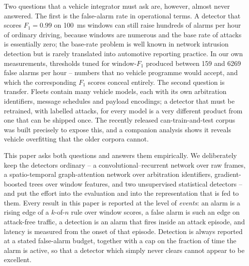 \documentclass[preprint,11pt,authoryear]{elsarticle}
\begin{document}
Two questions that a vehicle integrator must ask are, however, almost never answered. The first is
the false-alarm rate in operational terms. A detector that scores $F_1 = 0.99$ on
\SI{100}{\milli\second} windows can still raise hundreds of alarms per hour of ordinary driving,
because windows are numerous and the base rate of attacks is essentially zero; the
base-rate problem is well known in network intrusion detection \citep{flood2024baddesign,
goldschmidt2025datasets} but is rarely translated into automotive reporting practice. In our own
measurements, thresholds tuned for window-$F_1$ produced between 159 and 6269 false alarms per hour
-- numbers that no vehicle programme would accept, and which the corresponding $F_1$ scores conceal
entirely. The second question is transfer. Fleets contain many vehicle models, each with its own
arbitration identifiers, message schedules and payload encodings; a detector that must be retrained,
with labelled attacks, for every model is a very different product from one that can be shipped
once. The recently released can-train-and-test corpus \citep{lampe2023cantt} was built precisely to
expose this, and a companion analysis \citep{kidmose2025cansleuth} shows it reveals vehicle
overfitting that the older corpora cannot.

This paper asks both questions and answers them empirically. We deliberately keep the detectors
ordinary -- a convolutional--recurrent network over raw frames, a spatio-temporal graph-attention
network over arbitration identifiers, gradient-boosted trees over window features, and two
unsupervised statistical detectors -- and put the effort into the evaluation and into the
representation that is fed to them. Every result in this paper is reported at the level of
\emph{events}: an alarm is a rising edge of a $k$-of-$n$ rule over window scores, a false alarm is
such an edge on attack-free traffic, a detection is an alarm that fires inside an attack episode,
and latency is measured from the onset of that episode. Detection is always reported at a stated
false-alarm budget, together with a cap on the fraction of time the alarm is active, so that a
detector which simply never clears cannot appear to be excellent.
\end{document}
